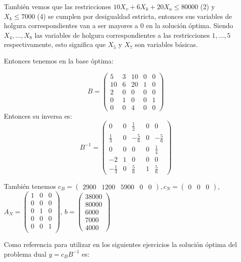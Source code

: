 \documentclass[10pt,a4paper]{article}
\begin{document}
También vemos que las restricciones $10 X_v + 6 X_k + 20 X_a \leq 80000$ (2) y $X_k \leq 7000$ (4) se cumplen por desigualdad estricta, entonces sus variables de holgura correspondientes van a ser mayores a 0 en la solución óptima.
Siendo $X_4, \dots, X_8$ las variables de holgura correspondientes a las restricciones $1, \dots, 5$ respectivamente, esto significa que $X_5$ y $X_7$ son variables básicas.

Entonces tenemos en la base óptima:

\[B = \begin{pmatrix}
	5  & 3 & 10 & 0 & 0 \\
	10 & 6 & 20 & 1 & 0 \\
	2  & 0 & 0  & 0 & 0 \\
	0  & 1 & 0  & 0 & 1 \\
	0  & 0 & 4  & 0 & 0
\end{pmatrix}\]
Entonces su inversa es:
\[B^{-1} = \begin{pmatrix}
	0  & 0 &\frac{1}{2} & 0 & 0 \\
	\frac{1}{3} & 0 & -\frac{5}{6} & 0 & -\frac{5}{6} \\
	0  & 0 & 0  & 0 & \frac{1}{4} \\
	-2 & 1 & 0  & 0 & 0 \\
	-\frac{1}{3}  & 0 & \frac{5}{6}  & 1 & \frac{5}{6}
\end{pmatrix}\]

También tenemos $c_B = \begin{pmatrix} 2900 & 1200 & 5900 & 0 & 0 \end{pmatrix}, c_N = \begin{pmatrix} 0 & 0 & 0 \end{pmatrix}$, $A_N = \begin{pmatrix}
	1 & 0 & 0 \\
	0 & 0 & 0 \\
	0 & 1 & 0 \\
	0 & 0 & 0 \\
	0 & 0 & 1 \\
\end{pmatrix}$, $b = \begin{pmatrix}
38000 \\
80000 \\
6000 \\
7000 \\
4000
\end{pmatrix}$

Como referencia para utilizar en los siguientes ejercicios la solución óptima del problema dual $y=c_B B^{-1}$ es:
\end{document}
